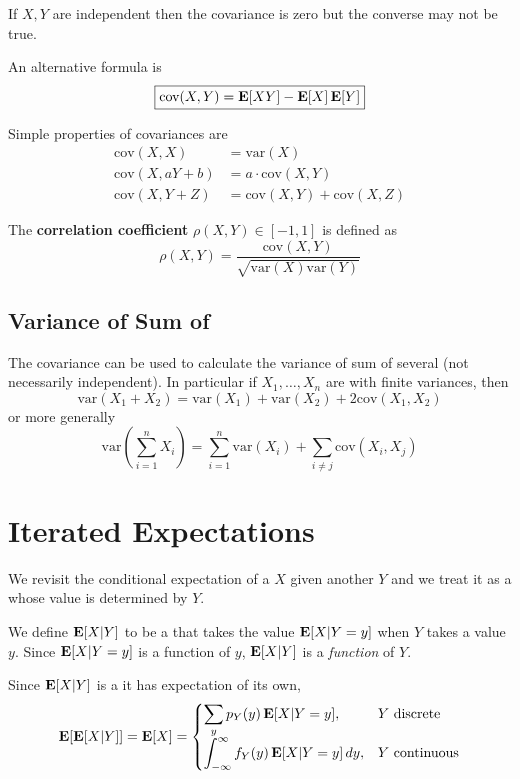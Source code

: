  \begin{remark}
    If $X, Y$ are independent then the covariance is zero but the converse may not be true.
 \end{remark}

 An alternative formula is 
 \[\boxed{\text{cov}(X,Y)=\operatorname{\textbf{E}}[XY]-\operatorname{\textbf{E}}[X]\operatorname{\textbf{E}}[Y]}\]

 Simple properties of covariances are
 \begin{align*}
     \text{cov}(X,X) &= \text{var}(X) \\
     \text{cov}(X, aY+b) &= a \cdot \text{cov}(X, Y) \\
     \text{cov}(X, Y+Z) &=\text{cov}(X,Y)+\text{cov}(X,Z)
 \end{align*}

 The \textbf{correlation coefficient} $\rho(X,Y) \in [-1, 1]$ is defined as 
 \[\boxed {\rho(X,Y) =\frac{\text{cov}(X,Y)}{\sqrt{\text{var}(X) \text{var}(Y)}} }\]

 \subsection{Variance of Sum of \RV}
 The covariance can be used to calculate the variance of sum of several \rv (not necessarily independent). In particular if $X_1, \ldots, X_n$ are \rv with finite variances, then
 \[\text{var}(X_1+X_2)=\text{var}(X_1)+\text{var}(X_2)+2\text{cov}(X_1, X_2)\]
 or more generally
 \[\text{var}\left(\sum_{i=1}^{n}X_i\right)=\sum_{i=1}^n\text{var}(X_i) + \sum_{i \neq j}\text{cov}(X_i, X_j)\]

 \section{Iterated Expectations}
 We revisit the conditional expectation of a \rv $X$ given another \rv $Y$ and we treat it as a \rv whose value is determined by $Y$.

 We define $\operatorname{\textbf{E}}[X|Y]$ to be a \rv that takes the value $\operatorname{\textbf{E}}[X|Y=y]$ when $Y$ takes a value $y$. Since $\operatorname{\textbf{E}}[X|Y=y]$ is a function of $y$, $\operatorname{\textbf{E}}[X|Y]$ is a \textit{function} of $Y$.

 Since $\operatorname{\textbf{E}}[X|Y]$ is a \rv it has expectation of its own,
 \[ \operatorname{\textbf{E}}[\operatorname{\textbf{E}}[X|Y]] = \operatorname{\textbf{E}}[X] = \begin{cases}
    \displaystyle\sum_y p_Y(y) \operatorname{\textbf{E}}[X|Y=y], & Y \text{ discrete} \\
    \displaystyle\int_{-\infty}^\infty f_Y(y)\operatorname{\textbf{E}}[X|Y=y] \, dy, & Y \text{ continuous}
 \end{cases} \]

